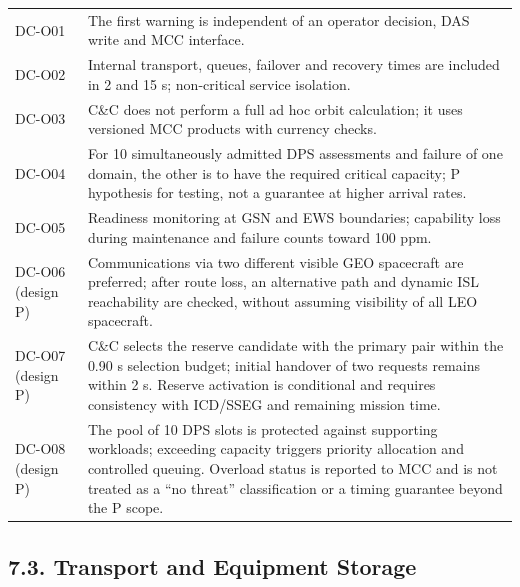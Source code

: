 \begingroup{}
\begin{longtable}{|P{0.16}|P{0.84}|}
\hline{}
 & \\ \hline
\endhead
\hline\endlastfoot
DC-O01 & The first warning is independent of an operator decision, DAS write and MCC interface.\\ \hline
DC-O02 & Internal transport, queues, failover and recovery times are included in 2 and 15 s; non-critical service isolation.\\ \hline
DC-O03 & C\&C does not perform a full ad hoc orbit calculation; it uses versioned MCC products with currency checks.\\ \hline
DC-O04 & For 10 simultaneously admitted DPS assessments and failure of one domain, the other is to have the required critical capacity; P hypothesis for testing, not a guarantee at higher arrival rates.\\ \hline
DC-O05 & Readiness monitoring at GSN and EWS boundaries; capability loss during maintenance and failure counts toward 100 ppm.\\ \hline
DC-O06 (design P) & Communications via two different visible GEO spacecraft are preferred; after route loss, an alternative path and dynamic ISL reachability are checked, without assuming visibility of all LEO spacecraft.\\ \hline
DC-O07 (design P) & C\&C selects the reserve candidate with the primary pair within the 0.90 s selection budget; initial handover of two requests remains within 2 s. Reserve activation is conditional and requires consistency with ICD/\allowbreak{}SSEG and remaining mission time.\\ \hline
DC-O08 (design P) & The pool of 10 DPS slots is protected against supporting workloads; exceeding capacity triggers priority allocation and controlled queuing. Overload status is reported to MCC and is not treated as a “no threat” classification or a timing guarantee beyond the P scope.\\*
\end{longtable}
\endgroup

\subsection{7.3. Transport and Equipment Storage}\label{transportation-and-storage-constraints}

